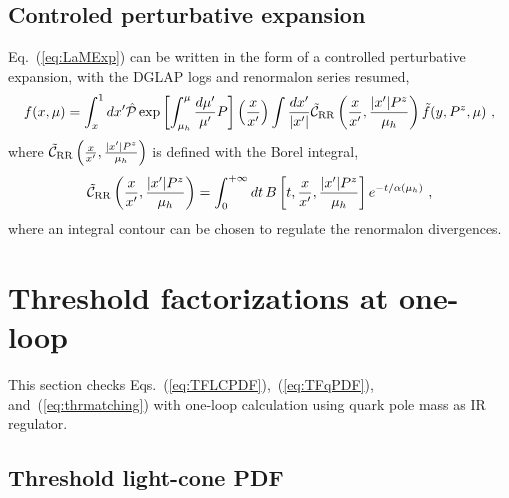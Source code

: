 \documentclass[a4paper,11pt]{article}
\begin{document}
\subsection{Controled perturbative expansion}
Eq.~(\ref{eq:LaMExp}) can be written in the form of a controlled perturbative expansion, with the DGLAP logs and renormalon series resumed,
\begin{align}\label{eq:LaMExp}
    f(x,\mu) = \int_{x}^{1} d x' \hat{\cal P} \exp{\left[\int_{\mu_h}^{\mu} \frac{d\mu'}{\mu'} P \right]\left(\frac{x}{x'}\right)} \int \frac{d x'}{|x'|} \tilde {\cal C}_{\rm RR} \left( \frac{x}{x'}, \frac{|x'|P^z}{\mu_h}\right) \tilde f(y,P^z,\mu)  \ ,
\end{align}
where $\tilde {\cal C}_{\rm RR} \left( \frac{x}{x'}, \frac{|x'|P^z}{\mu_h}\right)$ is defined with the Borel integral,
\begin{align}
    \tilde {\cal C}_{\rm RR} \left( \frac{x}{x'}, \frac{|x'|P^z}{\mu_h}\right)
    = \int_{0}^{+\infty} dt \, B\left[t,\frac{x}{x'}, \frac{|x'|P^z}{\mu_h}\right] e^{-t/\alpha(\mu_h)} \ ,
\end{align}
where an integral contour can be chosen to regulate the renormalon divergences. 

\fi


\section{Threshold factorizations at one-loop}\label{sec:1loopfm}
This section checks Eqs.~(\ref{eq:TFLCPDF}),~(\ref{eq:TFqPDF}), and~(\ref{eq:thrmatching}) with one-loop calculation using quark pole mass as IR regulator. 

\subsection{Threshold light-cone PDF}\label{sec:1loopfmLC}
\end{document}
